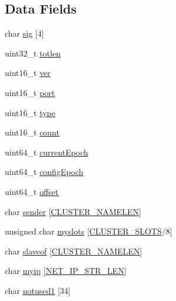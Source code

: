 \subsection*{Data Fields}
\begin{DoxyCompactItemize}
\item 
char \hyperlink{structcluster_msg_a44ca5d775a516861cbad4ea8f7ae5364}{sig} \mbox{[}4\mbox{]}
\item 
uint32\+\_\+t \hyperlink{structcluster_msg_a7c3d75c00327eb7e03f283418392443e}{totlen}
\item 
uint16\+\_\+t \hyperlink{structcluster_msg_aa10697fa6dc414fbc83710764c48899b}{ver}
\item 
uint16\+\_\+t \hyperlink{structcluster_msg_a8e0798404bf2cf5dabb84c5ba9a4f236}{port}
\item 
uint16\+\_\+t \hyperlink{structcluster_msg_acb5cfd209ba75c853d03f701e7f91679}{type}
\item 
uint16\+\_\+t \hyperlink{structcluster_msg_af6a39bfc7e1dc3b6f9c997c1c43fa996}{count}
\item 
uint64\+\_\+t \hyperlink{structcluster_msg_a97f41589e815c407f015841f5a3d816f}{current\+Epoch}
\item 
uint64\+\_\+t \hyperlink{structcluster_msg_a6bf0844859acadf5df37a7d49595680e}{config\+Epoch}
\item 
uint64\+\_\+t \hyperlink{structcluster_msg_a612bb2807d848cca89ea1437cceea886}{offset}
\item 
char \hyperlink{structcluster_msg_a81cb807c080c326e68e1ff07d2eaccce}{sender} \mbox{[}\hyperlink{cluster_8h_ace7a882972eff7149675252938643b6e}{C\+L\+U\+S\+T\+E\+R\+\_\+\+N\+A\+M\+E\+L\+EN}\mbox{]}
\item 
unsigned char \hyperlink{structcluster_msg_a5208677bb0ea19be90a6a6a5b742b7bf}{myslots} \mbox{[}\hyperlink{cluster_8h_aa3e2cb951eebb16725ecc3f5beefd9fd}{C\+L\+U\+S\+T\+E\+R\+\_\+\+S\+L\+O\+TS}/8\mbox{]}
\item 
char \hyperlink{structcluster_msg_a110072ca1cda63a0b08d06c3195056e2}{slaveof} \mbox{[}\hyperlink{cluster_8h_ace7a882972eff7149675252938643b6e}{C\+L\+U\+S\+T\+E\+R\+\_\+\+N\+A\+M\+E\+L\+EN}\mbox{]}
\item 
char \hyperlink{structcluster_msg_adc202e2ef9102baf45fe88d6adfbdb9d}{myip} \mbox{[}\hyperlink{server_8h_ad97c5405ed22a94e9fcc10fba577d6c0}{N\+E\+T\+\_\+\+I\+P\+\_\+\+S\+T\+R\+\_\+\+L\+EN}\mbox{]}
\item 
char \hyperlink{structcluster_msg_a1755ac7161beb0d2bf27b9dacb7e3888}{notused1} \mbox{[}34\mbox{]}
\item 

\end{DoxyCompactItemize}
